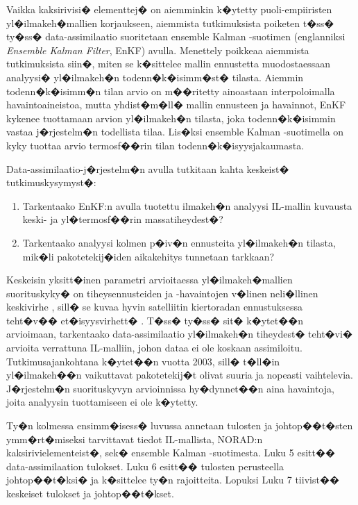 \documentclass[12pt,a4paper,finnish,margin=2in]{article}
\begin{document}
Vaikka kaksirivisi� elementtej� on aiemminkin k�ytetty puoli-empiiristen yl�ilmakeh�mallien korjaukseen\citep[esim.][]{Doornbos_2007, doornbos_2008}, aiemmista tutkimuksista poiketen t�ss� ty�ss� data-assimilaatio suoritetaan ensemble Kalman -suotimen (englanniksi \textit{Ensemble Kalman Filter}, EnKF) \citep{evensen_1994, evensen_2003} avulla. Menettely poikkeaa aiemmista tutkimuksista siin�, miten se k�sittelee mallin ennustetta muodostaessaan analyysi� yl�ilmakeh�n todenn�k�isimm�st� tilasta. Aiemmin todenn�k�isimm�n tilan arvio on m��ritetty ainoastaan interpoloimalla havaintoaineistoa, mutta yhdist�m�ll� mallin ennusteen ja havainnot, EnKF kykenee tuottamaan arvion yl�ilmakeh�n tilasta, joka todenn�k�isimmin vastaa j�rjestelm�n todellista tilaa. Lis�ksi ensemble Kalman -suotimella on kyky tuottaa arvio termosf��rin tilan todenn�k�isyysjakaumasta.

Data-assimilaatio-j�rjestelm�n avulla tutkitaan kahta keskeist� tutkimuskysymyst�:
\begin{enumerate}
\item Tarkentaako EnKF:n avulla tuotettu ilmakeh�n analyysi IL-mallin kuvausta keski- ja yl�termosf��rin massatiheydest�?
\item Tarkentaako analyysi kolmen p�iv�n ennusteita yl�ilmakeh�n tilasta, mik�li pakotetekij�iden aikakehitys tunnetaan tarkkaan?
\end{enumerate}

Keskeisin yksitt�inen parametri arvioitaessa yl�ilmakeh�mallien suorituskyky� on tiheysennusteiden ja -havaintojen v�linen neli�llinen keskivirhe \citep[k.s. esim.][s. 359]{wilks_2011}, sill� se kuvaa hyvin satelliitin kiertoradan ennustuksessa teht�v�� et�isyysvirhett� \citep{bruinsma_2012}. T�ss� ty�ss� sit� k�ytet��n arvioimaan, tarkentaako data-assimilaatio yl�ilmakeh�n tiheydest� teht�vi� arvioita verrattuna IL-malliin, johon dataa ei ole koskaan assimiloitu. Tutkimusajankohtana k�ytet��n vuotta 2003, sill� t�ll�in yl�ilmakeh��n vaikuttavat pakotetekij�t olivat suuria ja nopeasti vaihtelevia. J�rjestelm�n suorituskyvyn arvioinnissa hy�dynnet��n aina havaintoja, joita analyysin tuottamiseen ei ole k�ytetty.

Ty�n kolmessa ensimm�isess� luvussa annetaan tulosten ja johtop��t�sten ymm�rt�miseksi tarvittavat tiedot IL-mallista, NORAD:n kaksirivielementeist�, sek� ensemble Kalman -suotimesta. Luku 5 esitt�� data-assimilaation tulokset. Luku 6 esitt�� tulosten perusteella johtop��t�ksi� ja k�sittelee ty�n rajoitteita. Lopuksi Luku 7 tiivist�� keskeiset tulokset ja johtop��t�kset.
\end{document}
